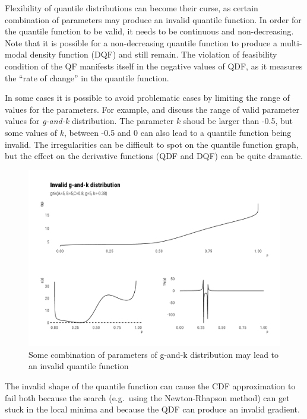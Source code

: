 \documentclass[
  12pt,
]{article}
\begin{document}
Flexibility of quantile distributions can become their curse, as certain combination of parameters may produce an invalid quantile function. In order for the quantile function to be valid, it needs to be continuous and non-decreasing. Note that it is possible for a non-decreasing quantile function to produce a multi-modal density function (DQF) and still remain. The violation of feasibility condition of the QF manifests itself in the negative values of QDF, as it measures the ``rate of change'' in the quantile function.

In some cases it is possible to avoid problematic cases by limiting the range of values for the parameters. For example, \citet{prangle2017GkPackageGandk} and \citet{rayner2002NumericalMaximumLikelihood} discuss the range of valid parameter values for \emph{g-and-k} distribution. The parameter \(k\) shoud be larger than -0.5, but some values of \(k\), between -0.5 and 0 can also lead to a quantile function being invalid. The irregularities can be difficult to spot on the quantile function graph, but the effect on the derivative functions (QDF and DQF) can be quite dramatic.

\begin{figure}

{\centering \includegraphics[width=0.8\linewidth]{ilbm_article_files/figure-latex/invalid-gnk-graph-1} 

}

\caption{Some combination of parameters of g-and-k distribution may lead to an invalid quantile function}\label{fig:invalid-gnk-graph}
\end{figure}

The invalid shape of the quantile function can cause the CDF approximation to fail both because the search (e.g.~using the Newton-Rhapson method) can get stuck in the local minima and because the QDF can produce an invalid gradient.
\end{document}
